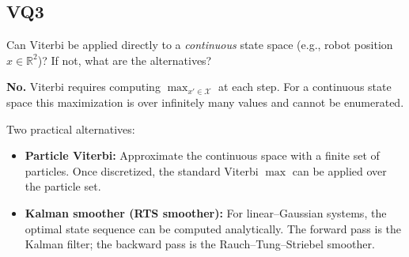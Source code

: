 \documentclass[12pt]{article}
\begin{document}
\subsection*{VQ3}
\begin{tcolorbox}[questionbox]
Can Viterbi be applied directly to a \emph{continuous} state space
(e.g., robot position $x \in \mathbb{R}^2$)? If not, what are the alternatives?
\end{tcolorbox}

\begin{tcolorbox}[answerbox]
\textbf{No.} Viterbi requires computing $\max_{x' \in \mathcal{X}}$ at each step.
For a continuous state space this maximization is over infinitely many values and
cannot be enumerated.

Two practical alternatives:
\begin{itemize}
  \item \textbf{Particle Viterbi:} Approximate the continuous space with a finite
        set of particles. Once discretized, the standard Viterbi $\max$ can be
        applied over the particle set.
  \item \textbf{Kalman smoother (RTS smoother):} For linear--Gaussian systems,
        the optimal state sequence can be computed analytically. The forward pass
        is the Kalman filter; the backward pass is the Rauch--Tung--Striebel
        smoother.
\end{itemize}
\end{tcolorbox}
\end{document}

